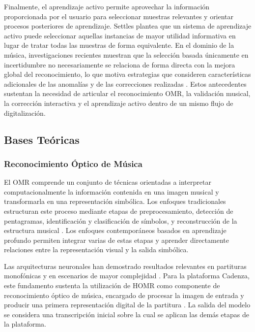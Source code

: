 \documentclass[conference]{IEEEtran}
\begin{document}
Finalmente, el aprendizaje activo permite aprovechar la información
proporcionada por el usuario para seleccionar muestras relevantes y orientar
procesos posteriores de aprendizaje. Settles \cite{settles2009} plantea
que un sistema de aprendizaje activo puede seleccionar aquellas instancias
de mayor utilidad informativa en lugar de tratar todas las muestras de forma
equivalente. En el dominio de la música, investigaciones recientes muestran
que la selección basada únicamente en incertidumbre no necesariamente se
relaciona de forma directa con la mejora global del reconocimiento, lo que
motiva estrategias que consideren características adicionales de las
anomalías y de las correcciones realizadas
\cite{mlsp2025}. Estos antecedentes sustentan la necesidad de articular el
reconocimiento OMR, la validación musical, la corrección interactiva y el
aprendizaje activo dentro de un mismo flujo de digitalización.

\subsection{Bases Teóricas}

\subsubsection{Reconocimiento Óptico de Música}

El OMR comprende un conjunto de técnicas orientadas a interpretar
computacionalmente la información contenida en una imagen musical y
transformarla en una representación simbólica. Los enfoques tradicionales
estructuran este proceso mediante etapas de preprocesamiento, detección de
pentagramas, identificación y clasificación de símbolos, y reconstrucción de
la estructura musical \cite{omr2020,rebelo2012}. Los enfoques
contemporáneos basados en aprendizaje profundo permiten integrar varias de
estas etapas y aprender directamente relaciones entre la representación
visual y la salida simbólica.

Las arquitecturas neuronales han demostrado resultados relevantes en
partituras monofónicas y en escenarios de mayor complejidad
\cite{calvo2018,riosvila2026}. Para la plataforma Cadenza, este
fundamento sustenta la utilización de HOMR como componente de
reconocimiento óptico de música, encargado de procesar la imagen de entrada
y producir una primera representación digital de la partitura
\cite{homr2024}. La salida del modelo se considera una transcripción
inicial sobre la cual se aplican las demás etapas de la plataforma.
\end{document}
